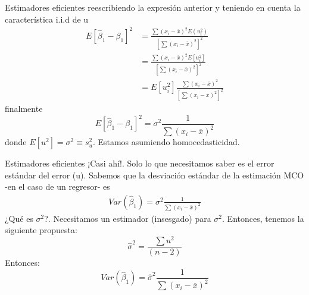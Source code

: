 \begin{frame}{Estimadores eficientes}
	reescribiendo la expresión anterior y teniendo en cuenta la característica i.i.d de u
	\begin{align*}
		E\left[ \widehat{\beta}_1 - \beta_1\right]^2 & = \frac{\sum (x_{i}-\overline{x})^2E(u_i^2)}{\left[\sum (x_{i}-\overline{x})^2\right]^2}\\
		& = \frac{\sum (x_{i}-\overline{x})^2E[u_i^2]}{\left[\sum (x_{i}-\overline{x})^2\right]^2}\\
		& = E[u_i^2] \frac{\sum (x_{i}-\overline{x})^2}{\left[\sum (x_{i}-\overline{x})^2\right]^2} \tag{3}
	\end{align*}
	finalmente
	$$E\left[ \widehat{\beta}_1 - \beta_1\right]^2 = \sigma^{2}\frac{1}{\sum (x_{i}-\overline{x})^2}$$
	donde $E[u^2]=\sigma^{2} \equiv s_{u}^{2}$. Estamos asumiendo homocedasticidad.
\end{frame}
\begin{frame}{Estimadores eficientes}
	¡Casi ahí!. Solo lo que necesitamos saber es el error estándar del error (u). Sabemos que la desviación estándar de la estimación MCO -en el caso de un regresor- es
	\begin{align*}
		Var(\widehat{\beta}_1) = \sigma^{2}\frac{1}{\sum (x_{i}-\overline{x})^2} \tag{4}
	\end{align*}
	¿Qué es $\sigma^{2}$?. Necesitamos un estimador (insesgado) para $\sigma^{2}$. Entonces, tenemos la siguiente propuesta:
	$$\widehat{\sigma}^{2} = \frac{\sum u^2}{(n-2)}$$
	Entonces:
	$$Var(\widehat{\beta}_1) = \widehat{\sigma}^{2}\frac{1}{\sum (x_{i}-\overline{x})^2}$$
\end{frame}

